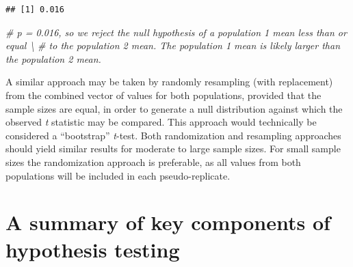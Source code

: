 \documentclass[]{book}
\newenvironment{Shaded}{\begin{snugshade}}{\end{snugshade}}
\newcommand{\CommentTok}[1]{\textcolor[rgb]{0.56,0.35,0.01}{\textit{#1}}}
\begin{document}
\begin{verbatim}
## [1] 0.016
\end{verbatim}

\begin{Shaded}
\begin{Highlighting}[]
\CommentTok{# p = 0.016, so we reject the null hypothesis of a population 1 mean less than or equal \textbackslash{}}
\CommentTok{# to the population 2 mean. The population 1 mean is likely larger than the population 2 mean.}
\end{Highlighting}
\end{Shaded}

A similar approach may be taken by randomly resampling (with replacement) from the combined vector of values for both populations, provided that the sample sizes are equal, in order to generate a null distribution against which the observed \emph{t} statistic may be compared. This approach would technically be considered a ``bootstrap'' \emph{t}-test. Both randomization and resampling approaches should yield similar results for moderate to large sample sizes. For small sample sizes the randomization approach is preferable, as all values from both populations will be included in each pseudo-replicate.

\hypertarget{a-summary-of-key-components-of-hypothesis-testing}{%
\section{A summary of key components of hypothesis testing}\label{a-summary-of-key-components-of-hypothesis-testing}}
\end{document}
